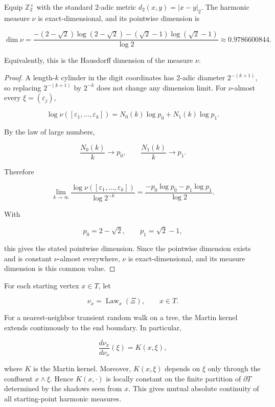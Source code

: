 \documentclass[11pt,a4paper]{scrartcl}
\begin{document}
\begin{corollary}\label{cor:dimension}
Equip \(\mathbb Z_2^\times\) with the standard 2-adic
metric \(d_2(x,y)=|x-y|_2\). The harmonic measure \(\nu\) is
exact-dimensional, and its pointwise dimension is

\[
\dim\nu
=
\frac{
-(2-\sqrt2)\log(2-\sqrt2)
-(\sqrt2-1)\log(\sqrt2-1)
}{\log 2}
\approx 0.9786600844 .
\]

Equivalently, this is the Hausdorff dimension of the measure \(\nu\).

\end{corollary}
\begin{proof}
A length-\(k\) cylinder in the digit coordinates has 2-adic diameter
\(2^{-(k+1)}\), so replacing \(2^{-(k+1)}\) by \(2^{-k}\) does not change any
dimension limit. For \(\nu\)-almost every \(\xi=(\varepsilon_j)\),

\[
\log\nu([\varepsilon_1,\ldots,\varepsilon_k])
=
N_0(k)\log p_0+N_1(k)\log p_1 .
\]

By the law of large numbers,

\[
\frac{N_0(k)}{k}\to p_0,
\qquad
\frac{N_1(k)}{k}\to p_1 .
\]

Therefore

\[
\lim_{k\to\infty}
\frac{\log\nu([\varepsilon_1,\ldots,\varepsilon_k])}
{\log 2^{-k}}
=
\frac{-p_0\log p_0-p_1\log p_1}{\log 2}.
\]

With

\[
p_0=2-\sqrt2,
\qquad
p_1=\sqrt2-1,
\]

this gives the stated pointwise dimension. Since the pointwise dimension exists
and is constant \(\nu\)-almost everywhere, \(\nu\) is exact-dimensional, and
its measure dimension is this common value.
\end{proof}

\begin{remark}\label{rem:other-starts}
For each starting vertex \(x\in T\), let

\[
\nu_x=\operatorname{Law}_x(\Xi),
\qquad x\in T.
\]

For a nearest-neighbor transient random walk on a tree, the Martin kernel
extends continuously to the end boundary. In particular,

\[
\frac{d\nu_x}{d\nu_o}(\xi)=K(x,\xi),
\]

where \(K\) is the Martin kernel. Moreover, \(K(x,\xi)\) depends on \(\xi\)
only through the confluent \(x\wedge \xi\). Hence \(K(x,\cdot)\) is locally
constant on the finite partition of \(\partial T\) determined by the shadows
seen from \(x\). This gives mutual absolute continuity of all starting-point
harmonic measures.

\end{remark}
\end{document}

